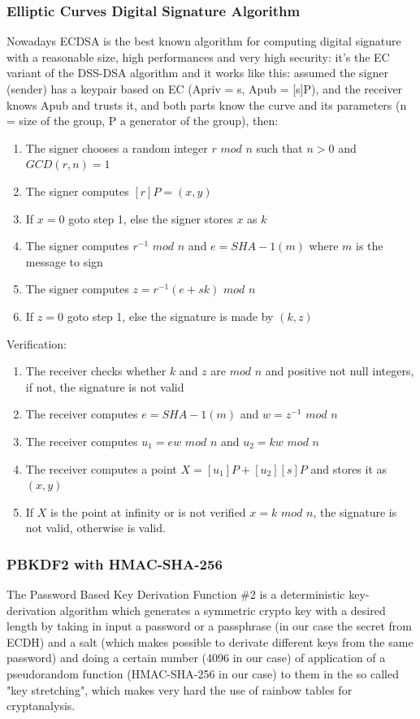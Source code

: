 \documentclass[a4paper,12pt]{article}
\begin{document}
\subsubsection{Elliptic Curves Digital Signature Algorithm}
Nowadays ECDSA is the best known algorithm for computing digital signature with a reasonable size, high performances and very high security: it's the EC variant of the DSS-DSA algorithm and it works like this: assumed the signer (sender) has a keypair based on EC (Apriv = s, Apub = [s]P), and the receiver knows Apub and trusts it, and both parts know the curve and its parameters (n = size of the group, P a generator of the group), then:
\linebreak
\begin{enumerate}
\item The signer chooses a random integer $r$ $mod$ $n$ such that $n > 0$ and $GCD(r,n) = 1$
\item The signer computes $[r]P = (x,y)$
\item If $x = 0$ goto step 1, else the signer stores $x$ as $k$
\item The signer computes $r^{-1}$ $mod$ $n$ and $e = SHA-1(m)$ where $m$ is the message to sign
\item The signer computes $z = r^{-1}(e + sk)$ $mod$ $n$
\item If $z = 0$ goto step 1, else the signature is made by $(k,z)$
\linebreak
\end{enumerate}
Verification:
\linebreak
\begin{enumerate}
\item The receiver checks whether $k$ and $z$ are $mod$ $n$ and positive not null integers, if not, the signature is not valid
\item The receiver computes $e = SHA-1(m)$ and $w = z^{-1}$ $mod$ $n$
\item The receiver computes $u_{1} = ew$ $mod$ $n$ and $u_{2} = kw$ $mod$ $n$
\item The receiver computes a point $X = [u_{1}]P + [u_{2}][s]P$ and stores it as $(x,y)$
\item If $X$ is the point at infinity or is not verified $x = k$ $mod$ $n$, the signature is not valid, otherwise is valid.
\end{enumerate}
\subsubsection{PBKDF2 with HMAC-SHA-256}
The Password Based Key Derivation Function \#2 is a deterministic key-derivation algorithm which generates a symmetric crypto key with a desired length by taking in input a password or a passphrase (in our case the secret from ECDH) and a salt (which makes possible to derivate different keys from the same password) and doing a certain number (4096 in our case) of application of a pseudorandom function (HMAC-SHA-256 in our case) to them in the so called "key stretching", which makes very hard the use of rainbow tables for cryptanalysis.
\end{document}
